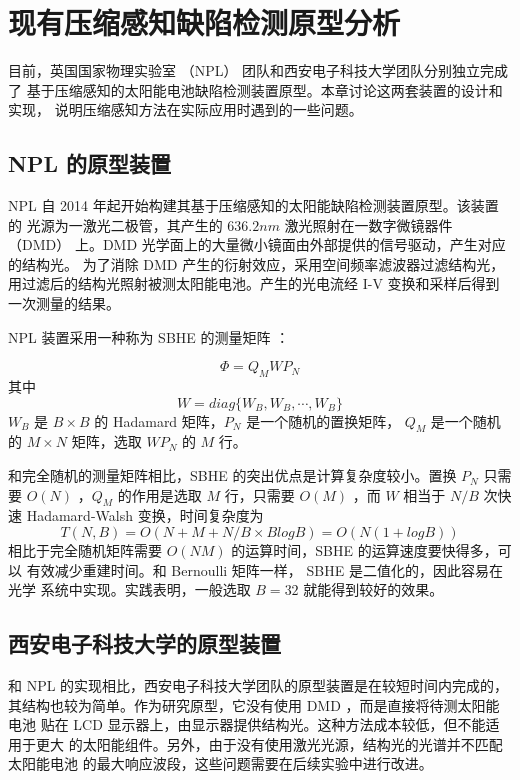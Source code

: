 \chapter{现有压缩感知缺陷检测原型分析}

目前，英国国家物理实验室 （NPL） 团队和西安电子科技大学团队分别独立完成了
基于压缩感知的太阳能电池缺陷检测装置原型。本章讨论这两套装置的设计和实现，
说明压缩感知方法在实际应用时遇到的一些问题。

\section{NPL 的原型装置}

NPL 自 2014 年起开始构建其基于压缩感知的太阳能缺陷检测装置原型。该装置的
光源为一激光二极管，其产生的 $636.2 nm$ 激光照射在一数字微镜器件 （DMD）
上。DMD 光学面上的大量微小镜面由外部提供的信号驱动，产生对应的结构光。
为了消除 DMD 产生的衍射效应，采用空间频率滤波器过滤结构光，
用过滤后的结构光照射被测太阳能电池。产生的光电流经 I-V
变换和采样后得到一次测量的结果。

NPL 装置采用一种称为 SBHE 的测量矩阵 \cite{BlockHadamard} ：
\begin{definition}[SBHE 矩阵]
\begin{equation}
\Phi = Q_M W P_N
\end{equation}
其中
\begin{equation}
W = diag\{W_B, W_B, \cdots, W_B\}
\end{equation}
$W_B$ 是 $B \times B$ 的 Hadamard 矩阵，$P_N$ 是一个随机的置换矩阵，
$Q_M$ 是一个随机的 $M \times N$ 矩阵，选取 $W P_N$ 的 $M$ 行。
\end{definition}

和完全随机的测量矩阵相比，SBHE 的突出优点是计算复杂度较小。置换
$P_N$ 只需要 $O(N)$ ，$Q_M$ 的作用是选取 $M$ 行，只需要 $O(M)$ ，而
$W$ 相当于 $N/B$ 次快速 Hadamard-Walsh 变换，时间复杂度为
\begin{equation}
T(N,B) = O(N + M + N/B \times B log B) = O(N(1+logB))
\end{equation}
相比于完全随机矩阵需要 $O(NM)$ 的运算时间，SBHE 的运算速度要快得多，可以
有效减少重建时间。和 Bernoulli 矩阵一样， SBHE 是二值化的，因此容易在光学
系统中实现。实践表明，一般选取 $B=32$ 就能得到较好的效果。

\section{西安电子科技大学的原型装置}

和 NPL 的实现相比，西安电子科技大学团队的原型装置是在较短时间内完成的，
其结构也较为简单。作为研究原型，它没有使用 DMD ，而是直接将待测太阳能电池
贴在 LCD 显示器上，由显示器提供结构光。这种方法成本较低，但不能适用于更大
的太阳能组件。另外，由于没有使用激光光源，结构光的光谱并不匹配太阳能电池
的最大响应波段，这些问题需要在后续实验中进行改进。

